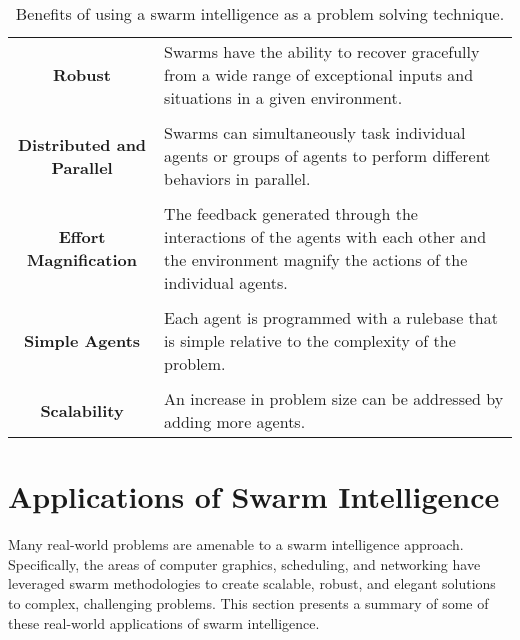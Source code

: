 \begin{table}[ht]
  \centering
  \small
  \begin{tabular}{|c|m{3.25in}|}
    \hline
    \textbf{Robust} & Swarms have the ability to recover gracefully from a wide range of exceptional inputs and situations in a given environment.\\
    & \\
    \textbf{Distributed and Parallel} & Swarms can simultaneously task individual agents or groups of agents to perform different behaviors in parallel.\\
    & \\
    \textbf{Effort Magnification} & The feedback generated through the interactions of the agents with each other and the environment magnify the actions of the individual agents.\\
    & \\
    \textbf{Simple Agents} & Each agent is programmed with a rulebase that is simple relative to the complexity of the problem.\\
    & \\
    \textbf{Scalability} & An increase in problem size can be addressed by adding more agents.\\
    \hline
  \end{tabular}
  \normalsize
\caption{Benefits of using a swarm intelligence as a problem solving technique.}
\label{tab:SwarmBenefits}
\end{table}


\section{Applications of Swarm Intelligence}

Many real-world problems are amenable to a swarm intelligence approach.  Specifically, the areas of computer graphics, scheduling, and networking have leveraged swarm methodologies to create scalable, robust, and elegant solutions to complex, challenging problems.  This section presents a summary of some of these real-world applications of swarm intelligence.  

